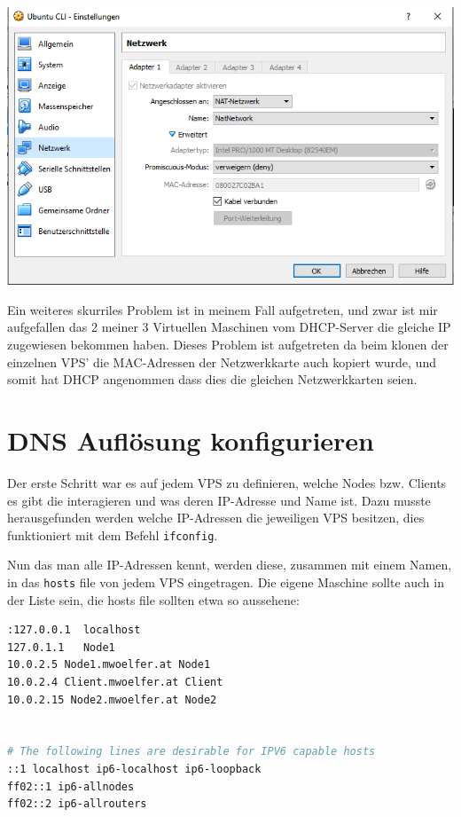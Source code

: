 \begin{minipage}{\linewidth}
	\centering
	\includegraphics[width=0.6\linewidth]{images/natnetwork2}
\end{minipage}

Ein weiteres skurriles Problem ist in meinem Fall aufgetreten, und zwar ist mir aufgefallen das 2 meiner 3 Virtuellen Maschinen vom DHCP-Server die gleiche IP zugewiesen bekommen haben. Dieses Problem ist aufgetreten da beim klonen der einzelnen VPS' die MAC-Adressen der Netzwerkkarte auch kopiert wurde, und somit hat DHCP angenommen dass dies die gleichen Netzwerkkarten seien. 

\section{DNS Auflösung konfigurieren}
Der erste Schritt war es auf jedem VPS zu definieren, welche Nodes bzw. Clients es gibt die interagieren und was deren IP-Adresse und Name ist. Dazu musste herausgefunden werden welche IP-Adressen die jeweiligen VPS besitzen, dies funktioniert mit dem Befehl \verb|ifconfig|.

Nun das man alle IP-Adressen kennt, werden diese, zusammen mit einem Namen, in das \verb|hosts| file von jedem VPS eingetragen. Die eigene Maschine sollte auch in der Liste sein, die hosts file sollten etwa so aussehene: 

\begin{lstlisting}[language=bash]
:127.0.0.1	localhost
127.0.1.1	Node1
10.0.2.5 Node1.mwoelfer.at Node1
10.0.2.4 Client.mwoelfer.at Client
10.0.2.15 Node2.mwoelfer.at Node2


# The following lines are desirable for IPV6 capable hosts
::1 localhost ip6-localhost ip6-loopback
ff02::1 ip6-allnodes
ff02::2 ip6-allrouters
\end{lstlisting}